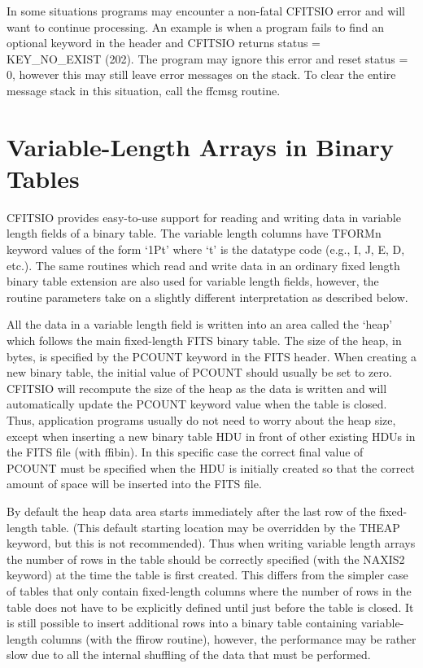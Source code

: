 In some situations programs may encounter a non-fatal CFITSIO error and
will want to continue processing.  An example is when a program fails
to find an optional keyword in the header and CFITSIO returns status =
KEY\_NO\_EXIST (202).  The program may ignore this error and reset
status = 0, however this may still leave error messages on the stack.
To clear the entire message stack in this situation, call the ffcmsg
routine.


\section{Variable-Length Arrays in Binary Tables}

CFITSIO provides easy-to-use support for reading and writing data in
variable length fields of a binary table. The variable length columns
have TFORMn keyword values of the form `1Pt' where `t' is the datatype
code (e.g., I, J, E, D, etc.). The same routines which read and write
data in an ordinary fixed length binary table extension are also used
for variable length fields, however, the routine parameters take on a
slightly different interpretation as described below.

All the data in a variable length field is written into an area called
the `heap' which follows the main fixed-length FITS binary table. The
size of the heap, in bytes, is specified by the PCOUNT keyword in the
FITS header. When creating a new binary table, the initial value of
PCOUNT should usually be set to zero. CFITSIO will recompute the size of
the heap as the data is written and will automatically update the PCOUNT
keyword value when the table is closed. Thus, application programs
usually do not need to worry about the heap size, except when inserting
a new binary table HDU in front of other existing HDUs in the FITS file
(with ffibin). In this specific case the correct final value of PCOUNT
must be specified when the HDU is initially created so that the correct
amount of space will be inserted into the FITS file.

By default the heap data area starts immediately after the last row of
the fixed-length table.  (This default starting location may be
overridden by the THEAP keyword, but this is not recommended).  Thus
when writing variable length arrays the number of rows in the table
should be correctly specified (with the NAXIS2 keyword) at the time the
table is first created.  This differs from the simpler case of tables
that only contain fixed-length columns where the number of rows in the
table does not have to be explicitly defined until just before the
table is closed.  It is still possible to insert additional rows into a
binary table containing variable-length columns (with the ffirow
routine), however, the performance may be rather slow due to all the
internal shuffling of the data that must be performed.

